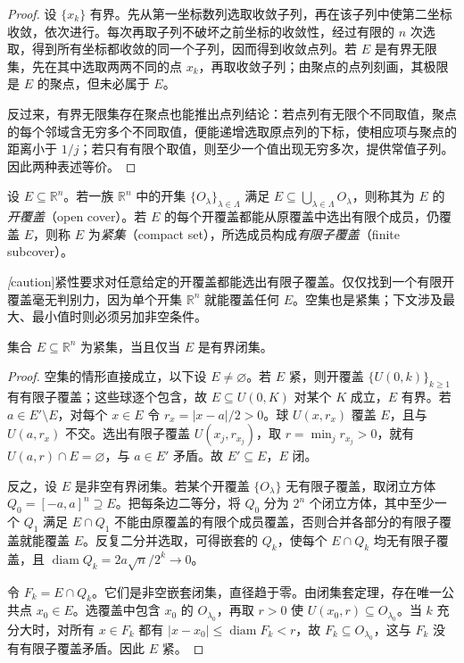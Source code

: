 \begin{proof}
设 $\{x_k\}$ 有界。先从第一坐标数列选取收敛子列，再在该子列中使第二坐标收敛，依次进行。每次再取子列不破坏之前坐标的收敛性，经过有限的 $n$ 次选取，得到所有坐标都收敛的同一个子列，因而得到收敛点列。若 $E$ 是有界无限集，先在其中选取两两不同的点 $x_k$，再取收敛子列；由聚点的点列刻画，其极限是 $E$ 的聚点，但未必属于 $E$。

反过来，有界无限集存在聚点也能推出点列结论：若点列有无限个不同取值，聚点的每个邻域含无穷多个不同取值，便能递增选取原点列的下标，使相应项与聚点的距离小于 $1/j$；若只有有限个取值，则至少一个值出现无穷多次，提供常值子列。因此两种表述等价。
\end{proof}

\begin{definition}
\label{def:euclidean-compact-set}
设 $E\subseteq\mathbb R^n$。若一族 $\mathbb R^n$ 中的开集 $\{O_\lambda\}_{\lambda\in\Lambda}$ 满足 $E\subseteq\bigcup_{\lambda\in\Lambda}O_\lambda$，则称其为 $E$ 的\emph{开覆盖}（open cover）。若 $E$ 的每个开覆盖都能从原覆盖中选出有限个成员，仍覆盖 $E$，则称 $E$ 为\emph{紧集}（compact set），所选成员构成\emph{有限子覆盖}（finite subcover）。
\end{definition}

\emph[caution]{紧性要求对任意给定的开覆盖都能选出有限子覆盖。}仅仅找到一个有限开覆盖毫无判别力，因为单个开集 $\mathbb R^n$ 就能覆盖任何 $E$。空集也是紧集；下文涉及最大、最小值时则必须另加非空条件。

\begin{theorem}
\label{thm:euclidean-heine-borel}
集合 $E\subseteq\mathbb R^n$ 为紧集，当且仅当 $E$ 是有界闭集。
\end{theorem}

\begin{proof}
空集的情形直接成立，以下设 $E\neq\varnothing$。若 $E$ 紧，则开覆盖 $\{U(0,k)\}_{k\geq1}$ 有有限子覆盖；这些球逐个包含，故 $E\subseteq U(0,K)$ 对某个 $K$ 成立，$E$ 有界。若 $a\in E'\setminus E$，对每个 $x\in E$ 令 $r_x=|x-a|/2>0$。球 $U(x,r_x)$ 覆盖 $E$，且与 $U(a,r_x)$ 不交。选出有限子覆盖 $U(x_j,r_{x_j})$，取 $r=\min_jr_{x_j}>0$，就有 $U(a,r)\cap E=\varnothing$，与 $a\in E'$ 矛盾。故 $E'\subseteq E$，$E$ 闭。

反之，设 $E$ 是非空有界闭集。若某个开覆盖 $\{O_\lambda\}$ 无有限子覆盖，取闭立方体 $Q_0=[-a,a]^n\supseteq E$。把每条边二等分，将 $Q_0$ 分为 $2^n$ 个闭立方体，其中至少一个 $Q_1$ 满足 $E\cap Q_1$ 不能由原覆盖的有限个成员覆盖，否则合并各部分的有限子覆盖就能覆盖 $E$。反复二分并选取，可得嵌套的 $Q_k$，使每个 $E\cap Q_k$ 均无有限子覆盖，且 $\operatorname{diam}Q_k=2a\sqrt n/2^k\to0$。

令 $F_k=E\cap Q_k$。它们是非空嵌套闭集，直径趋于零。由闭集套定理，存在唯一公共点 $x_0\in E$。选覆盖中包含 $x_0$ 的 $O_{\lambda_0}$，再取 $r>0$ 使 $U(x_0,r)\subseteq O_{\lambda_0}$。当 $k$ 充分大时，对所有 $x\in F_k$ 都有 $|x-x_0|\leq\operatorname{diam}F_k<r$，故 $F_k\subseteq O_{\lambda_0}$，这与 $F_k$ 没有有限子覆盖矛盾。因此 $E$ 紧。
\end{proof}

